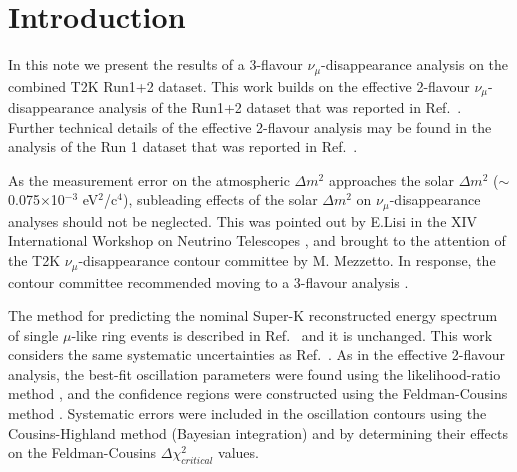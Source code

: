 \clearpage

\section {Introduction }
\label{sec:intro}

In this note we present the results of a 3-flavour $\nu_{\mu}$-disappearance analysis on the combined T2K Run1+2
dataset. This work builds on the effective 2-flavour $\nu_{\mu}$-disappearance analysis of the Run1+2 dataset
that was reported in Ref.\ \cite{OurRun1and2Analysis2F}.
Further technical details of the effective 2-flavour analysis may be found in the analysis of the
Run 1 dataset that was reported in Ref.\ \cite{OurRun1DisappAnalysis2F}.

As the measurement error on the atmospheric $\Delta m^{2}$ 
approaches the solar $\Delta m^{2}$ ($\sim$0.075$\times$10$^{-3}$ eV$^2$/c$^{4}$),
subleading effects of the solar $\Delta m^{2}$ on $\nu_{\mu}$-disappearance analyses should not be neglected. 
This was pointed out by E.Lisi in the XIV International Workshop on Neutrino Telescopes \cite{LisiNeuTel11},
and brought to the attention of the T2K $\nu_{\mu}$-disappearance contour committee by M. Mezzetto.
In response, the contour committee recommended moving to a 3-flavour analysis \cite{T2KNuMuContourCom}.

The method for predicting the nominal Super-K reconstructed energy spectrum of single $\mu$-like ring events 
is described in Ref.\ \cite{OurRun1and2Analysis2F} and it is unchanged.
This work considers the same systematic uncertainties as Ref.\ \cite{OurRun1and2Analysis2F}.
As in the effective 2-flavour analysis, the best-fit oscillation parameters were found using the likelihood-ratio method \cite{StatAnalysisCowan}, 
and the confidence regions were constructed using the Feldman-Cousins method \cite{FeldmanCousins}.
Systematic errors were included in the oscillation contours using the Cousins-Highland method (Bayesian integration) 
and by determining their effects on the Feldman-Cousins $\Delta\chi^{2}_{critical}$ values.

